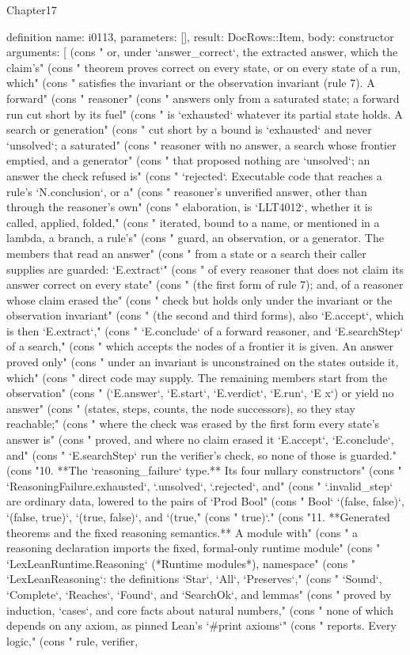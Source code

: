 \begin{lexlean}{Chapter17}
\begin{semanticmodule}
definition{
  name: i0113,
  parameters: [],
  result: DocRows::Item,
  body: constructor{
    arguments: [
      (cons "   or, under `answer_correct`, the extracted answer, which the claim's" (cons "   theorem proves correct on every state, or on every state of a run, which" (cons "   satisfies the invariant or the observation invariant (rule 7). A forward" (cons "   reasoner" (cons "   answers only from a saturated state; a forward run cut short by its fuel" (cons "   is `exhausted` whatever its partial state holds. A search or generation" (cons "   cut short by a bound is `exhausted` and never `unsolved`; a saturated" (cons "   reasoner with no answer, a search whose frontier emptied, and a generator" (cons "   that proposed nothing are `unsolved`; an answer the check refused is" (cons "   `rejected`. Executable code that reaches a rule's `N.conclusion`, or a" (cons "   reasoner's unverified answer, other than through the reasoner's own" (cons "   elaboration, is `LLT4012`, whether it is called, applied, folded," (cons "   iterated, bound to a name, or mentioned in a lambda, a branch, a rule's" (cons "   guard, an observation, or a generator. The members that read an answer" (cons "   from a state or a search their caller supplies are guarded: `E.extract`" (cons "   of every reasoner that does not claim its answer correct on every state" (cons "   (the first form of rule 7); and, of a reasoner whose claim erased the" (cons "   check but holds only under the invariant or the observation invariant" (cons "   (the second and third forms), also `E.accept`, which is then `E.extract`," (cons "   `E.conclude` of a forward reasoner, and `E.searchStep` of a search," (cons "   which accepts the nodes of a frontier it is given. An answer proved only" (cons "   under an invariant is unconstrained on the states outside it, which" (cons "   direct code may supply. The remaining members start from the observation" (cons "   (`E.answer`, `E.start`, `E.verdict`, `E.run`, `E x`) or yield no answer" (cons "   (states, steps, counts, the node successors), so they stay reachable;" (cons "   where the check was erased by the first form every state's answer is" (cons "   proved, and where no claim erased it `E.accept`, `E.conclude`, and" (cons "   `E.searchStep` run the verifier's check, so none of those is guarded." (cons "10. **The `reasoning_failure` type.** Its four nullary constructors" (cons "    `ReasoningFailure.exhausted`, `.unsolved`, `.rejected`, and" (cons "    `.invalid_step` are ordinary data, lowered to the pairs of `Prod Bool" (cons "    Bool` `(false, false)`, `(false, true)`, `(true, false)`, and `(true," (cons "    true)`." (cons "11. **Generated theorems and the fixed reasoning semantics.** A module with" (cons "    a reasoning declaration imports the fixed, formal-only runtime module" (cons "    `LexLeanRuntime.Reasoning` (*Runtime modules*), namespace" (cons "    `LexLeanReasoning`: the definitions `Star`, `All`, `Preserves`," (cons "    `Sound`, `Complete`, `Reaches`, `Found`, and `SearchOk`, and lemmas" (cons "    proved by induction, `cases`, and core facts about natural numbers," (cons "    none of which depends on any axiom, as pinned Lean's `#print axioms`" (cons "    reports. Every logic," (cons "    rule, verifier, }}
\end{semanticmodule}
\end{lexlean}
